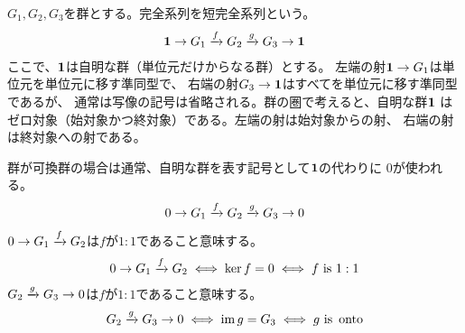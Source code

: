 	\begin{definition}[群の短完全系列]\label{def:群の短完全系列} %
		$G_1,G_2,G_3$を群とする。完全系列を短完全系列という。
		\begin{equation*}\begin{split} %
			\mybf{1} \to G_1 \xto{f} G_2 \xto{g} G_3 \to \mybf{1}
		\end{split}\end{equation*} %
		ここで、${\mathbf{1}}$は自明な群（単位元だけからなる群）とする。
		左端の射${\mathbf{1}}\to G_1$は単位元を単位元に移す準同型で、
		右端の射$G_3\to{\ensuremath{\mathbf{1}}}$はすべてを単位元に移す準同型であるが、
		通常は写像の記号は省略される。群の圏で考えると、自明な群${\mathbf{1}}$
		はゼロ対象（始対象かつ終対象）である。左端の射は始対象からの射、
		右端の射は終対象への射である。
	\end{definition} %

	群が可換群の場合は通常、自明な群を表す記号として${\mathbf{1}}$の代わりに
	$0$が使われる。
	\begin{equation*}\begin{split} %
		0 \to G_1 \xto{f} G_2 \xto{g} G_3 \to 0
	\end{split}\end{equation*} %
	$0\to G_1\xrightarrow{f} G_2$は$f$が$1:1$であること意味する。
	\begin{equation*}\begin{split} %
		0\to G_1\xto{f} G_2 \iff \ker f = 0 \iff f \text{ is }1:1
	\end{split}\end{equation*} %
	$G_2 \xrightarrow{g} G_3 \to 0$は$f$が$1:1$であること意味する。
	\begin{equation*}\begin{split} %
		G_2 \xto{g} G_3 \to 0 \iff \im g = G_3 \iff g \text{ is }\onto
	\end{split}\end{equation*} %
\endgroup %
